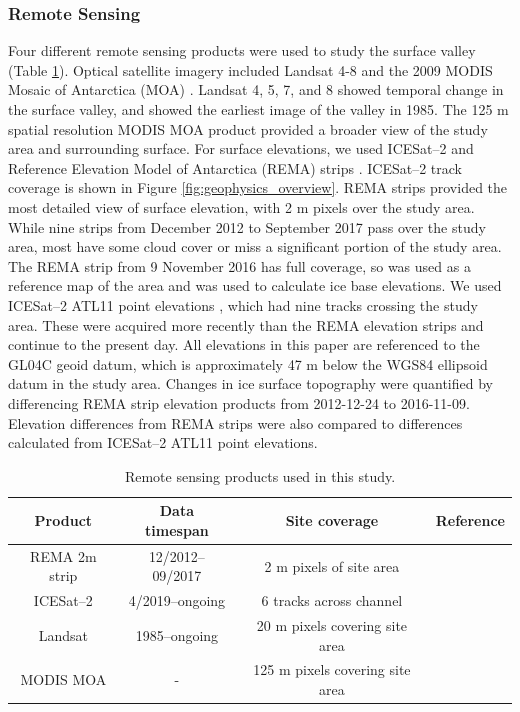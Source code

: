 \subsubsection{Remote Sensing} \label{sec:remote}

Four different remote sensing products were used to study the surface valley (Table \ref{tab:remote_table}). Optical satellite imagery included Landsat 4-8 \citep{RoyLandsat8Scienceproduct2014} and the 2009 MODIS Mosaic of Antarctica (MOA) \citep{haran2014modis}. Landsat 4, 5, 7, and 8 showed temporal change in the surface valley, and showed the earliest image of the valley in 1985. The 125 m spatial resolution MODIS MOA product provided a broader view of the study area and surrounding surface. For surface elevations, we used ICESat--2 and Reference Elevation Model of Antarctica (REMA) strips \citep{howat2019reference,smith2021v3}. ICESat--2 track coverage is shown in Figure \ref{fig:geophysics_overview}. REMA strips provided the most detailed view of surface elevation, with 2 m pixels over the study area. While nine strips from December 2012 to September 2017 pass over the study area, most have some cloud cover or miss a significant portion of the study area. The REMA strip from 9 November 2016 has full coverage, so was used as a reference map of the area and was used to calculate ice base elevations. We used ICESat--2 ATL11 point elevations \citep{smith2021v3}, which had nine tracks crossing the study area. These were acquired more recently than the REMA elevation strips and continue to the present day.   All elevations in this paper are referenced to the GL04C geoid datum, which is approximately 47 m below the WGS84 ellipsoid datum in the study area. Changes in ice surface topography were quantified by differencing REMA strip elevation products  from 2012-12-24 to 2016-11-09. Elevation differences from REMA strips were also compared to differences calculated from ICESat--2 ATL11 point elevations.



\begin{table}
\centering
\begin{tabular}{ |c|c c c| } 
 \hline
 Product & Data timespan & Site coverage &  Reference \\ 
 \hline
 REMA 2m strip &  12/2012--09/2017 & 2 m pixels of site area 
 & \cite{howat2019reference}\\ 
 ICESat--2 &  4/2019--ongoing &  6 tracks across channel  & \cite{smith2021v3}\\
 Landsat &  1985--ongoing & 20 m pixels covering site area  & \cite{RoyLandsat8Scienceproduct2014}\\ 
 MODIS MOA & - & 125 m pixels covering site area  & \cite{haran2014modis}\\
 \hline
\end{tabular}
\label{tab:remote_table}
\caption{Remote sensing products used in this study.}
\end{table}


